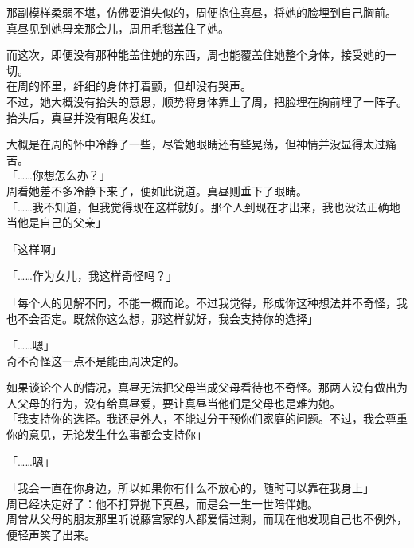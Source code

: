 那副模样柔弱不堪，仿佛要消失似的，周便抱住真昼，将她的脸埋到自己胸前。\\

真昼见到她母亲那会儿，周用毛毯盖住了她。

而这次，即便没有那种能盖住她的东西，周也能覆盖住她整个身体，接受她的一切。\\

在周的怀里，纤细的身体打着颤，但却没有哭声。\\

不过，她大概没有抬头的意思，顺势将身体靠上了周，把脸埋在胸前埋了一阵子。\\

抬头后，真昼并没有眼角发红。

大概是在周的怀中冷静了一些，尽管她眼睛还有些晃荡，但神情并没显得太过痛苦。\\

「……你想怎么办？」\\

周看她差不多冷静下来了，便如此说道。真昼则垂下了眼睛。\\

「……我不知道，但我觉得现在这样就好。那个人到现在才出来，我也没法正确地当他是自己的父亲」

「这样啊」

「……作为女儿，我这样奇怪吗？」

「每个人的见解不同，不能一概而论。不过我觉得，形成你这种想法并不奇怪，我也不会否定。既然你这么想，那这样就好，我会支持你的选择」

「……嗯」\\

奇不奇怪这一点不是能由周决定的。

如果谈论个人的情况，真昼无法把父母当成父母看待也不奇怪。那两人没有做出为人父母的行为，没有给真昼爱，要让真昼当他们是父母也是难为她。\\

「我支持你的选择。我还是外人，不能过分干预你们家庭的问题。不过，我会尊重你的意见，无论发生什么事都会支持你」

「……嗯」

「我会一直在你身边，所以如果你有什么不放心的，随时可以靠在我身上」\\

周已经决定好了：他不打算抛下真昼，而是会一生一世陪伴她。\\

周曾从父母的朋友那里听说藤宫家的人都爱情过剩，而现在他发现自己也不例外，便轻声笑了出来。\\

